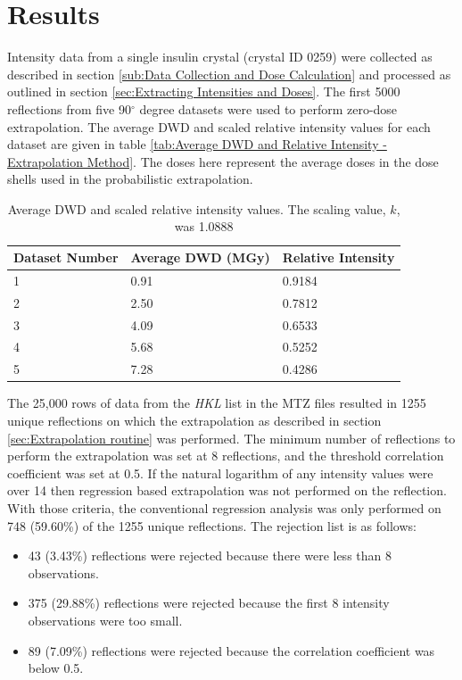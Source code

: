 \section{Results}
\label{sec:Results - Zero-dose extrapolation}
Intensity data from a single insulin crystal (crystal ID 0259) were collected as described in section \ref{sub:Data Collection and Dose Calculation} and processed as outlined in section \ref{sec:Extracting Intensities and Doses}.
The first 5000 reflections from five 90$^{\circ}$ degree datasets were used to perform zero-dose extrapolation.
The average DWD and scaled relative intensity values for each dataset are given in table \ref{tab:Average DWD and Relative Intensity - Extrapolation Method}.
The doses here represent the average doses in the dose shells used in the probabilistic extrapolation.
\begin{table}[ht!]
	\caption{Average DWD and scaled relative intensity values. The scaling value, $k$, was 1.0888}
	\centering
	\begin{tabular}{p{3.2cm} | p{3.75cm} | p{3.3cm}}
		Dataset Number    & Average DWD (MGy)     & Relative Intensity \\
		\hline
		1                 & 0.91                  & 0.9184 \\
		2                 & 2.50                  & 0.7812 \\
		3                 & 4.09                  & 0.6533 \\
        4                 & 5.68                  & 0.5252 \\
        5                 & 7.28                  & 0.4286 \\
	\end{tabular}
	\label{tab:Average DWD and Relative Intensity}
\end{table}
The 25,000 rows of data from the \textit{HKL} list in the MTZ files resulted in 1255 unique reflections on which the extrapolation as described in section \ref{sec:Extrapolation routine} was performed.
The minimum number of reflections to perform the extrapolation was set at 8 reflections, and the threshold correlation coefficient was set at 0.5.
If the natural logarithm of any intensity values were over 14 then regression based extrapolation was not performed on the reflection.
With those criteria, the conventional regression analysis was only performed on 748 (59.60\%) of the 1255 unique reflections.
The rejection list is as follows:
\begin{itemize}
    \item 43 (3.43\%) reflections were rejected because there were less than 8 observations.
    \item 375 (29.88\%) reflections were rejected because the first 8 intensity observations were too small.
    \item 89 (7.09\%) reflections were rejected because the correlation coefficient was below 0.5.
\end{itemize}
